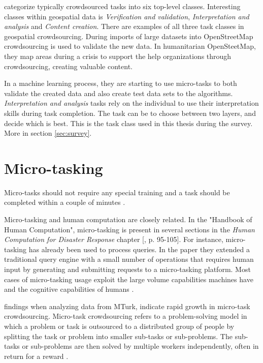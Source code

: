 \cite{Gadiraju2015} categorize typically crowdsourced tasks into six top-level classes. Interesting classes within geospatial data is \textit{Verification and validation}, \textit{Interpretation and analysis} and \textit{Content creation}. There are examples of all three task classes in geospatial crowdsourcing. During imports of large datasets into OpenStreetMap crowdsourcing is used to validate the new data. In humanitarian OpenSteetMap, they map areas during a crisis to support the help organizations through crowdsourcing, creating valuable content. 

In a machine learning process, they are starting to use micro-tasks to both validate the created data and also create test data sets to the algorithms. \textit{Interpretation and analysis} tasks rely on the individual to use their interpretation skills during task completion. The task can be to choose between two layers, and decide which is best. This is the task class used in this thesis during the survey. More in section \ref{sec:survey}.

\section{Micro-tasking}\label{sec:microtasking}

Micro-tasks should not require any special training and a task should be completed within a couple of minutes \citep{Ipeirotis2010}.  

Micro-tasking and human computation are closely related. In the "Handbook of Human Computation", micro-tasking is present in several sections in the \textit{Human Computation for Disaster Response} chapter [\citep{Meier2013}, p. 95-105].  For instance, micro-tasking has already been used to process queries. In the \cite{Franklin2011} paper they extended a traditional query engine with a small number of operations that requires human input by generating and submitting requests to a micro-tasking platform. Most cases of micro-tasking usage exploit the large volume capabilities machines have and the cognitive capabilities of humans \citep{Difallah2016}.  

\cite{Gadiraju2015} findings when analyzing data from MTurk, indicate rapid growth in micro-task crowdsourcing. Micro-task crowdsourcing refers to a problem-solving model in which a problem or task is outsourced to a distributed group of people by splitting the task or problem into smaller sub-tasks or sub-problems. The sub-tasks or sub-problems are then solved by multiple workers independently, often in return for a reward \citep{Sarasua2012}. 

